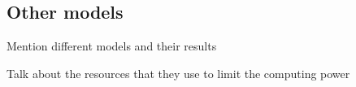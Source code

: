 \subsection{Other models}\label{subsection:other_models}

{\color{orange}
Mention different models and their results

Talk about the resources that they use to limit the computing power
}